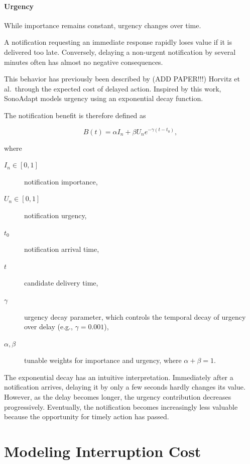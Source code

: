 \paragraph{Urgency}

While importance remains constant, urgency changes over time.

A notification requesting an immediate response rapidly loses value if it is delivered too late. Conversely, delaying a non-urgent notification by several minutes often has almost no negative consequences.

This behavior has previously been described by (ADD PAPER!!!) Horvitz et al.~through the expected cost of delayed action. Inspired by this work, SonoAdapt models urgency using an exponential decay function.

The notification benefit is therefore defined as

\begin{equation}
B(t)
=
\alpha I_n
+
\beta U_ne^{-\gamma(t-t_0)},
\label{eq:benefit}
\end{equation}

where

\begin{description}
\item[{$I_n \in [0, 1]$}] notification importance,
\item[{$U_n \in [0, 1]$}] notification urgency,
\item[$t_0$] notification arrival time,
\item[$t$] candidate delivery time,
\item[$\gamma$] urgency decay parameter, which controls the temporal decay of urgency over delay (e.g., $\gamma = 0.001$),
\item[$\alpha, \beta$] tunable weights for importance and urgency, where $\alpha + \beta = 1$.
\end{description}

The exponential decay has an intuitive interpretation. Immediately after a notification arrives, delaying it by only a few seconds hardly changes its value. However, as the delay becomes longer, the urgency contribution decreases progressively. Eventually, the notification becomes increasingly less valuable because the opportunity for timely action has passed.


\section{Modeling Interruption Cost}

